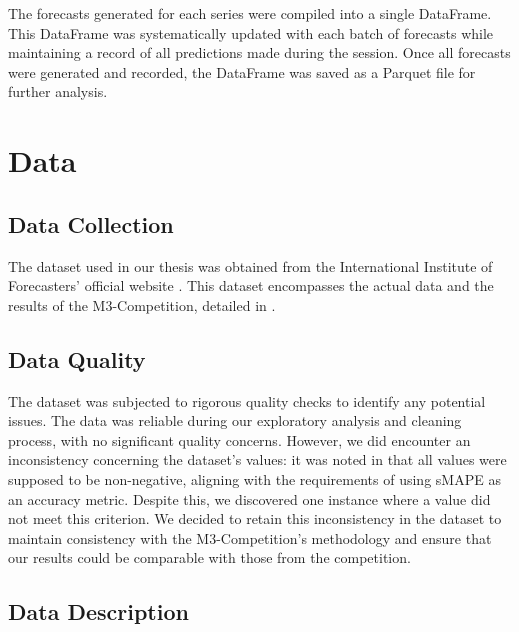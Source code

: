 \documentclass[12pt,a4paper]{article}
\begin{document}
The forecasts generated for each series were compiled into a single DataFrame. This DataFrame was systematically updated with each batch of forecasts while maintaining a record of all predictions made during the session. Once all forecasts were generated and recorded, the DataFrame was saved as a Parquet file for further analysis.


\newpage
{\centering \section{Data} \par}

\subsection{Data Collection}

The dataset used in our thesis was obtained from the International Institute of Forecasters' official website \parencite{IIF}. This dataset encompasses the actual data and the results of the M3-Competition, detailed in \parencite{MAKRIDAKIS2000}. 

\subsection{Data Quality}

The dataset was subjected to rigorous quality checks to identify any potential issues. The data was reliable during our exploratory analysis and cleaning process, with no significant quality concerns. However, we did encounter an inconsistency concerning the dataset's values: it was noted in \cite{MAKRIDAKIS2000} that all values were supposed to be non-negative, aligning with the requirements of using sMAPE as an accuracy metric. Despite this, we discovered one instance where a value did not meet this criterion. We decided to retain this inconsistency in the dataset to maintain consistency with the M3-Competition's methodology and ensure that our results could be comparable with those from the competition.

\subsection{Data Description} \label{data_description}
\end{document}
